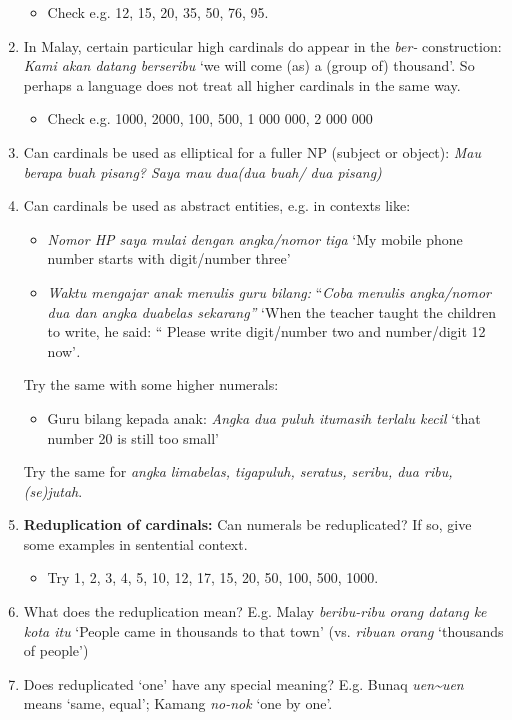 \documentclass[output=paper]{LSP/langsci}
\begin{document}
\begin{enumerate}
\begin{itemize}
\item Check e.g. 12, 15, 20, 35, 50, 76, 95. 
\end{itemize}
\item In Malay, certain particular high cardinals do appear in the \textit{ber-} construction: \textit{Kami akan datang berseribu} `we will come (as) a (group of) thousand'. So perhaps a language does not treat all higher cardinals in the same way. 
\begin{itemize}
\item Check e.g. 1000, 2000, 100, 500, 1 000 000, 2 000 000
\end{itemize}
\item Can cardinals be used as elliptical for a fuller NP (subject or object): \textit{Mau berapa buah pisang? Saya mau} \textit{dua}\textit{(dua buah/ dua pisang)}
\item Can cardinals be used as abstract entities, e.g. in contexts like: 
\begin{itemize}
\item \textit{Nomor HP saya mulai dengan angka/nomor tiga} `My mobile phone number starts with digit/number three' 
\item \textit{Waktu mengajar anak menulis guru bilang:} ``\textit{Coba menulis angka/nomor dua dan angka duabelas sekarang''}  `When the teacher taught the children to write, he said: `` Please write digit/number two and number/digit 12 now'\textit{.} 
\end{itemize}
Try the same with some higher numerals: 
\begin{itemize}
\item Guru bilang kepada anak: \textit{Angka dua puluh itu}\textit{masih terlalu kecil } `that number 20 is still too small' 
\end{itemize}
Try the same for \textit{angka} \textit{limabelas, tigapuluh, seratus, seribu, dua ribu, (se)jutah}.
\item  \textbf{Reduplication of cardinals:} Can numerals be reduplicated? If so, give some examples in sentential context. 
\begin{itemize}
\item Try 1, 2, 3, 4, 5, 10, 12, 17, 15, 20, 50, 100, 500, 1000.
\end{itemize}
\item What does the reduplication mean? E.g. Malay \textit{beribu-ribu orang datang ke kota itu} `People came in thousands to that town' (vs. \textit{ribuan orang} `thousands of people') 
\item Does reduplicated `one' have any special meaning? E.g. Bunaq \textit{uen\~{}uen} means `same, equal'; Kamang \textit{no-nok} `one by one'.

\end{enumerate}
\end{document}
